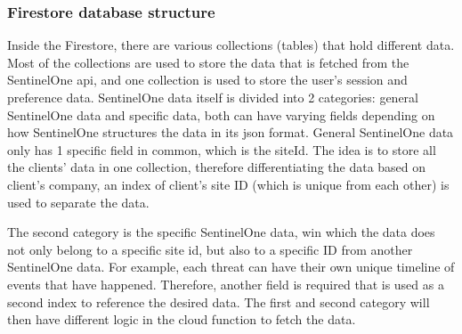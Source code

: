\subsubsection{Firestore database structure}

Inside the Firestore, there are various collections (tables) that hold different data. Most of the collections are used to store the
data that is fetched from the SentinelOne \acrshort{api}, and one collection is used to store the user's session and preference data.
SentinelOne data itself is divided into 2 categories: general SentinelOne data and specific data, both can have varying fields
depending on how SentinelOne structures the data in its \acrshort{json} format. General SentinelOne data only has 1 specific field
in common, which is the siteId. The idea is to store all the clients' data in one collection, therefore differentiating the data
based on client's company, an index of client's site ID (which is unique from each other) is used to separate the data.

The second category is the specific SentinelOne data, win which the data does not only belong to a specific site \acrshort{id}, but also to a
specific ID from another SentinelOne data. For example, each threat can have their own unique timeline of events that have happened.
Therefore, another field is required that is used as a second index to reference the desired data. The first and second category will
then have different logic in the cloud function to fetch the data.



